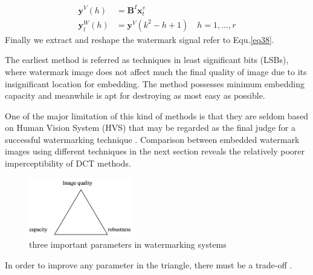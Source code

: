 \begin{align}
    \mathbf{y}^V(h)  &=  \mathbf{B}^I\mathbf{x}_t^v \\
    \mathbf{y}_t^W(h) &= \mathbf{y}^V(k^2-h+1) \quad h = 1,...,r
    \label{eq38}
\end{align}
Finally we extract and reshape the watermark signal refer to Equ.\ref{eq38}. 

The earliest method is referred as techniques in least significant bits (LSBs), where watermark image does not affect much the final quality of image due to its insignificant location for embedding. The method possesses minimum embedding capacity and meanwhile is apt for destroying as most easy as possible.

One of the major limitation of this kind of methods is that they are seldom based on Human Vision System (HVS) that may be regarded as the final judge for a successful watermarking technique \cite{LuWei_ICA}. Comparison between embedded watermark images using different techniques in the next section reveals the relatively poorer imperceptibility of DCT methods.


\begin{figure}[H]
\centering
\includegraphics[width=0.4\textwidth]{images/watermark_tradeoff.png}
\caption{ three important parameters in watermarking systems}
\label{trade-off}
\end{figure}
In order to improve any parameter in the triangle, there
must be a trade-off \cite{DCT_watermark}. 